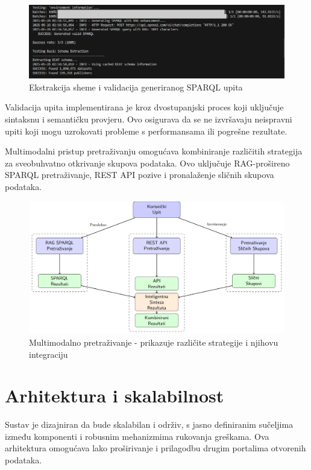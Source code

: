 \begin{figure}[htbp]
    \centering
    \includegraphics[width=1\textwidth]{figures/izvjestaj_image_11.png}
    \caption{Ekstrakcija sheme i validacija generiranog SPARQL upita}
    \label{fig:schema_extraction}
\end{figure}

Validacija upita implementirana je kroz dvostupanjski proces koji uključuje sintaksnu i semantičku provjeru. Ovo osigurava da se ne izvršavaju neispravni upiti koji mogu uzrokovati probleme s performansama ili pogrešne rezultate.

Multimodalni pristup pretraživanju omogućava kombiniranje različitih strategija za sveobuhvatno otkrivanje skupova podataka. Ovo uključuje RAG-prošireno SPARQL pretraživanje, REST API pozive i pronalaženje sličnih skupova podataka.

\begin{figure}[htbp]
    \centering
    \includegraphics[width=1\textwidth]{figures/multimodal_search.png}
    \caption{Multimodalno pretraživanje - prikazuje različite strategije i njihovu integraciju}
    \label{fig:multimodal_search}
\end{figure}

\section{Arhitektura i skalabilnost}

Sustav je dizajniran da bude skalabilan i održiv, s jasno definiranim sučeljima između komponenti i robusnim mehanizmima rukovanja greškama. Ova arhitektura omogućava lako proširivanje i prilagodbu drugim portalima otvorenih podataka.


